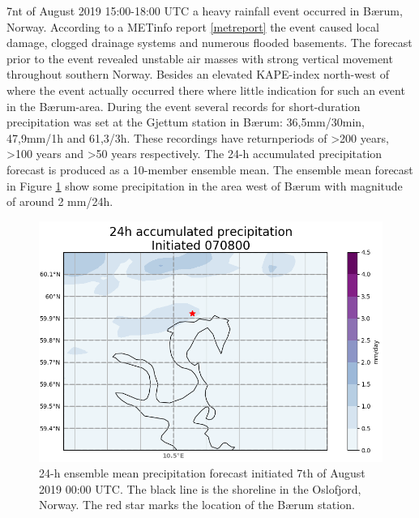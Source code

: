 7nt of August 2019 15:00-18:00 UTC a heavy rainfall event occurred in Bærum, Norway. According to a METinfo report \ref{metreport} the event caused local damage, clogged drainage systems and numerous flooded basements. The forecast prior to the event revealed unstable air masses with strong vertical movement throughout southern Norway. Besides an elevated KAPE-index north-west of where the event actually occurred there where little indication for such an event in the Bærum-area. During the event several records for short-duration precipitation was set at the Gjettum station in Bærum: 36,5mm/30min, 47,9mm/1h and 61,3/3h. These recordings have returnperiods of >200 years, >100 years and >50 years respectively. The 24-h accumulated precipitation forecast is produced as a 10-member ensemble mean. The ensemble mean forecast in Figure \ref{fig:ens_mean} show some precipitation in the area west of Bærum with magnitude of around 2 mm/24h.  

\begin{figure}[hbt!]
    \centering
    \includegraphics[scale=0.4]{figures/ens_mean.PNG}
    \caption{24-h ensemble mean precipitation forecast initiated 7th of August 2019 00:00 UTC. The black line is the shoreline in the Oslofjord, Norway. The red star marks the location of the Bærum station.}
    \label{fig:ens_mean}
\end{figure}

